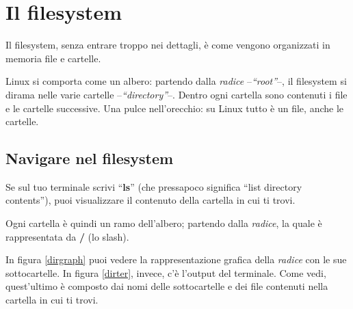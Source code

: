\section{Il filesystem}\label{filesystem}
Il filesystem, senza entrare troppo nei dettagli, è come vengono organizzati in memoria file e cartelle. 

Linux si comporta come un albero: partendo dalla \emph{radice} --\emph{``root''}--, il filesystem si dirama nelle varie cartelle --\emph{``directory''}--. Dentro ogni cartella sono contenuti i file e le cartelle successive. Una pulce nell'orecchio: su Linux tutto è un file, anche le cartelle.\\

\subsection{Navigare nel filesystem}
Se sul tuo terminale scrivi ``\textbf{ls}'' (che pressapoco significa ``list directory contents''), puoi visualizzare il contenuto della cartella in cui ti trovi.

Ogni cartella è quindi un ramo dell'albero; partendo dalla \emph{radice}, la quale è rappresentata da \textbf{/} (lo slash). 

In figura \ref{dirgraph} puoi vedere la rappresentazione grafica della \emph{radice} con le sue sottocartelle. In figura \ref{dirter}, invece, c'è l'output del terminale. Come vedi, quest'ultimo è composto dai nomi delle sottocartelle e dei file contenuti nella cartella in cui ti trovi.

